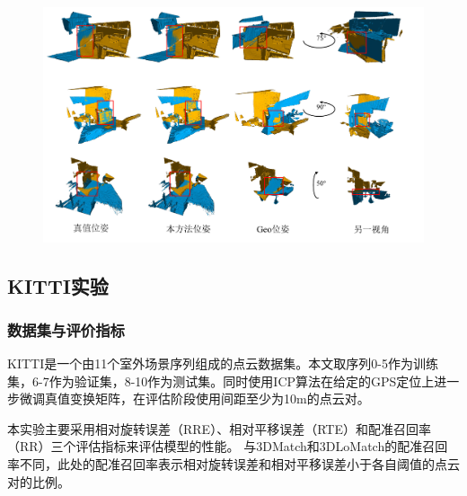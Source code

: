     \vspace{-0.1cm}
    \begin{figure}[h]
        \centering
        \includegraphics[width = \textwidth]{my/figure/3-6.pdf}
        \label{fig:low_geometry}
    \end{figure}
    \vspace{-0.35cm}

    \subsection{KITTI实验}
    \subsubsection{数据集与评价指标}
    KITTI是一个由11个室外场景序列组成的点云数据集。本文取序列0-5作为训练集，6-7作为验证集，8-10作为测试集。同时使用ICP算法在给定的GPS定位上进一步微调真值变换矩阵，在评估阶段使用间距至少为10m的点云对。\par
    本实验主要采用相对旋转误差（RRE）、相对平移误差（RTE）和配准召回率（RR）三个评估指标来评估模型的性能。
    与3DMatch和3DLoMatch的配准召回率不同，此处的配准召回率表示相对旋转误差和相对平移误差小于各自阈值的点云对的比例。\par
